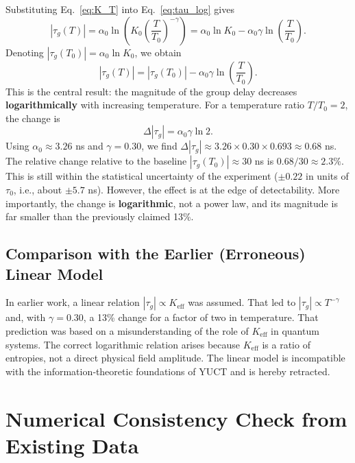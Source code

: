 \documentclass[12pt,a4paper]{article}
\newcommand{\Keff}{K_{\mathrm{eff}}}
\begin{document}
	Substituting Eq.~\eqref{eq:K_T} into Eq.~\eqref{eq:tau_log} gives
	\begin{equation}
		|\tau_g(T)| = \alpha_0 \ln\!\left(K_0 \left(\frac{T}{T_0}\right)^{-\gamma}\right)
		= \alpha_0 \ln K_0 - \alpha_0 \gamma \ln\!\left(\frac{T}{T_0}\right).
	\end{equation}
	Denoting \(|\tau_g(T_0)| = \alpha_0 \ln K_0\), we obtain
	\begin{equation}
		|\tau_g(T)| = |\tau_g(T_0)| - \alpha_0 \gamma \ln\!\left(\frac{T}{T_0}\right).
		\label{eq:tau_T_log}
	\end{equation}
	This is the central result: the magnitude of the group delay decreases \textbf{logarithmically} with increasing temperature. For a temperature ratio \(T/T_0 = 2\), the change is
	\begin{equation}
		\Delta |\tau_g| = \alpha_0 \gamma \ln 2.
	\end{equation}
	Using \(\alpha_0 \approx 3.26\) ns and \(\gamma = 0.30\), we find \(\Delta |\tau_g| \approx 3.26 \times 0.30 \times 0.693 \approx 0.68\) ns. The relative change relative to the baseline \(|\tau_g(T_0)| \approx 30\) ns is \(0.68 / 30 \approx 2.3\%\). This is still within the statistical uncertainty of the experiment (\(\pm 0.22\) in units of \(\tau_0\), i.e., about \(\pm 5.7\) ns). However, the effect is at the edge of detectability. More importantly, the change is \textbf{logarithmic}, not a power law, and its magnitude is far smaller than the previously claimed 13\%.
	
	\subsection{Comparison with the Earlier (Erroneous) Linear Model}
	
	In earlier work, a linear relation \(|\tau_g| \propto \Keff\) was assumed. That led to \(|\tau_g| \propto T^{-\gamma}\) and, with \(\gamma = 0.30\), a 13\% change for a factor of two in temperature. That prediction was based on a misunderstanding of the role of \(\Keff\) in quantum systems. The correct logarithmic relation arises because \(\Keff\) is a ratio of entropies, not a direct physical field amplitude. The linear model is incompatible with the information‑theoretic foundations of YUCT and is hereby retracted.
	
	\section{Numerical Consistency Check from Existing Data}
	
\end{document}
